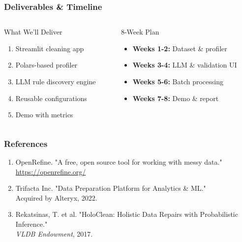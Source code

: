 \documentclass{beamer}
\begin{document}
\begin{frame}
    \frametitle{Deliverables \& Timeline}
    
    \begin{columns}[T]
        \begin{column}{0.48\textwidth}
            \begin{block}{What We'll Deliver}
                \begin{enumerate}
                    \item Streamlit cleaning app
                    \item Polars-based profiler
                    \item LLM rule discovery engine
                    \item Reusable configurations
                    \item Demo with metrics
                \end{enumerate}
            \end{block}
        \end{column}
        
        \begin{column}{0.48\textwidth}
            \begin{exampleblock}{8-Week Plan}
                \small
                \begin{itemize}
                    \item \textbf{Weeks 1-2:} Dataset \& profiler
                    \item \textbf{Weeks 3-4:} LLM \& validation UI
                    \item \textbf{Weeks 5-6:} Batch processing
                    \item \textbf{Weeks 7-8:} Demo \& report
                \end{itemize}
                \vspace{0.3cm}
            \end{exampleblock}
        \end{column}
    \end{columns}
\end{frame}

\begin{frame}[allowframebreaks]
    \frametitle{References}
    
    \footnotesize
    \begin{enumerate}
        \item OpenRefine. "A free, open source tool for working with messy data." \\
              \url{https://openrefine.org/}
        
        \item Trifacta Inc. "Data Preparation Platform for Analytics \& ML." \\
              Acquired by Alteryx, 2022.
        
        \item Rekatsinas, T. et al. "HoloClean: Holistic Data Repairs with Probabilistic Inference." \\
              \textit{VLDB Endowment}, 2017.
    \end{enumerate}
\end{frame}
\end{document}
